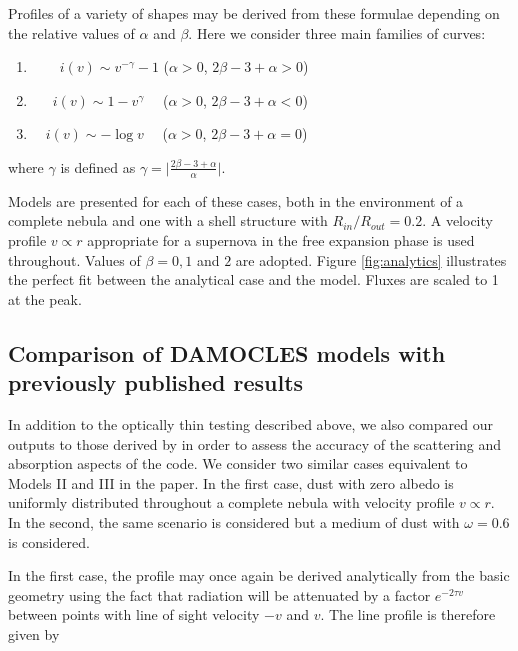 \documentclass[useAMS,usenatbib,usegraphicx]{mnras}
\begin{document}
Profiles of a variety of shapes may be derived from these formulae depending on the relative values of $\alpha$ and $\beta$.  Here we consider three main families of curves:


\begin{enumerate}\parskip3pt

	\item \ \ $\quad i(v)  \sim v^{-\gamma}-1$ \quad ($\alpha>0$, $2\beta-3+\alpha>0$)
	\item \ $\quad i(v)  \sim 1-v^\gamma$ \quad \ \ ($\alpha>0$, $2\beta-3+\alpha<0$)
	\item  $\quad i(v) \sim -\log v$ \quad \ \ ($\alpha>0$, $2\beta-3+\alpha=0$)

\end{enumerate}


\noindent where $\gamma$ is defined as $\gamma= \lvert \frac{2\beta-3+\alpha}{\alpha} \rvert$.  

Models are presented for each of these cases, both in the environment of a complete nebula and one with a shell structure with $R_{in}/R_{out}=0.2$.  A velocity profile $v \propto r$ appropriate for a supernova in the free expansion phase is used throughout.  Values of $\beta = 0, 1$ and $2$ are adopted.  Figure \ref{fig:analytics} illustrates the perfect fit between the analytical case and the model.  Fluxes are scaled to 1 at the peak.


\subsection{Comparison of DAMOCLES models with previously published results}
\label{opt_thick_testing}




In addition to the optically thin testing described above, we also compared our outputs to those derived by \citet{Lucy1989a} in order to assess the accuracy of the scattering and absorption aspects of the code.  We consider two similar cases equivalent to Models II and III in the \citet{Lucy1989a} paper. In the first case, dust with zero albedo is uniformly distributed throughout a complete nebula with velocity profile $v \propto r$.  In the second, the same scenario is considered but a medium of dust with $\omega =0.6$ is considered.

In the first case, the profile may once again be derived analytically from the basic geometry using the fact that radiation will be attenuated by a factor $e^{-2\tau v}$ between points with line of sight velocity $-v$ and $v$.  The line profile is therefore given by
\end{document}

